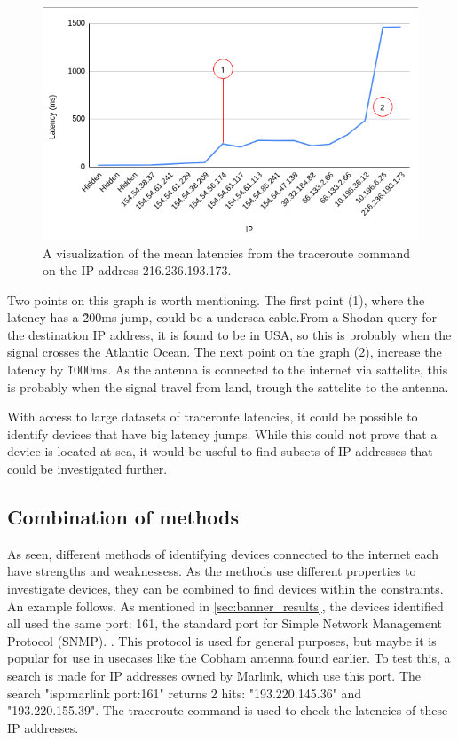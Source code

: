 \begin{figure} [H]
    \centering
    \includegraphics[scale=0.7]{Figurer/latency_graph_marked.png}
    \caption{A visualization of the mean latencies from the traceroute command on the IP address 216.236.193.173.}
    \label{fig:traceroute_graph}
\end{figure}

Two points on this graph is worth mentioning. The first point (1), where the latency has a \~200ms jump, could be a undersea cable.From a Shodan query for the destination IP address, it is found to be in USA, so this is probably when the signal crosses the Atlantic Ocean. The next point on the graph (2), increase the latency by \~1000ms. As the antenna is connected to the internet via sattelite, this is probably when the signal travel from land, trough the sattelite to the antenna.

With access to large datasets of traceroute latencies, it could be possible to identify devices that have big latency jumps. While this could not prove that a device is located at sea, it would be useful to find subsets of IP addresses that could be investigated further.

\subsection{Combination of methods} \label{sec:combo}
As seen, different methods of identifying devices connected to the internet each have strengths and weaknessess. As the methods use different properties to investigate devices, they can be combined to find devices within the constraints. An example follows.
As mentioned in \cref{sec:banner_results}, the devices identified all used the same port: 161, the standard port for Simple Network Management Protocol (SNMP). \cite{www_ports}. This protocol is used for general purposes, but maybe it is popular for use in usecases like the Cobham antenna found earlier. To test this, a search is made for IP addresses owned by Marlink, which use this port. The search "isp:marlink port:161" returns 2 hits: "193.220.145.36" and "193.220.155.39". The traceroute command is used to check the latencies of these IP addresses.

